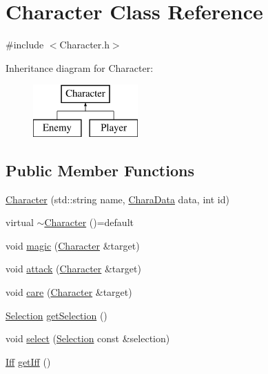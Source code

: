 \hypertarget{class_character}{}\section{Character Class Reference}
\label{class_character}


{\ttfamily \#include $<$Character.\+h$>$}

Inheritance diagram for Character\+:\begin{figure}[H]
\begin{center}
\leavevmode
\includegraphics[height=2.000000cm]{class_character}
\end{center}
\end{figure}
\subsection*{Public Member Functions}
\begin{DoxyCompactItemize}
\item 
\hyperlink{class_character_abcabc54ae5d60699204c5db2484fc116}{Character} (std\+::string name, \hyperlink{struct_chara_data}{Chara\+Data} data, int id)
\item 
virtual \hyperlink{class_character_a3333a88ae593c36b229c90371e935d42}{$\sim$\+Character} ()=default
\item 
void \hyperlink{class_character_a04eee23fbdb9c13b806d6ff0d9131c04}{magic} (\hyperlink{class_character}{Character} \&target)
\item 
void \hyperlink{class_character_a459859c74ba468345de63f436ee4442b}{attack} (\hyperlink{class_character}{Character} \&target)
\item 
void \hyperlink{class_character_a1933b175d4533053433422522da38181}{care} (\hyperlink{class_character}{Character} \&target)
\item 
\hyperlink{struct_selection}{Selection} \hyperlink{class_character_a854b7c44f252ed1c8456112ca2bee9a1}{get\+Selection} ()
\item 
void \hyperlink{class_character_ab209a191029576ff3f4ae2cc136733bf}{select} (\hyperlink{struct_selection}{Selection} const \&selection)
\item 
\hyperlink{_character_8h_a2c0364e3d1fbdb7881a87792637f65f8}{Iff} \hyperlink{class_character_aa2766fd908e56f386c6a946c9cde4c5d}{get\+Iff} ()
\end{DoxyCompactItemize}
